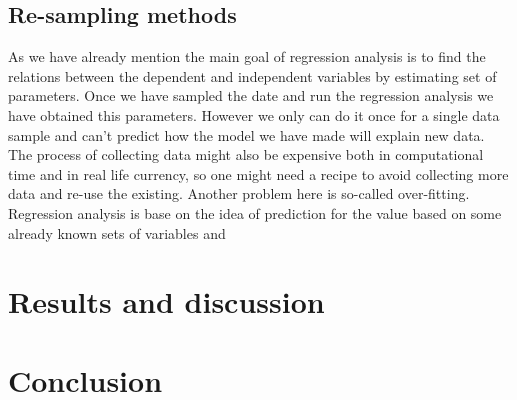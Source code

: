 \documentclass[10pt]{article}
\begin{document}
\subsection{Re-sampling methods}
As we have already mention the main goal of regression analysis is to find the relations between the dependent and independent variables by estimating set of parameters. Once we have sampled the date and run the regression analysis we have obtained this parameters. However we only can do it once for a single data sample and can't predict how the model we have made will explain new data. The process of collecting data might also be expensive both in computational time and in real life currency, so one might need a recipe to avoid collecting more data and re-use the existing. Another problem here is so-called over-fitting. Regression analysis is base on the idea of prediction for the value based on some already known sets of variables and 


\section{Results and discussion} \label{Results}

\section{Conclusion}\label{Conclusion}
\end{document}
